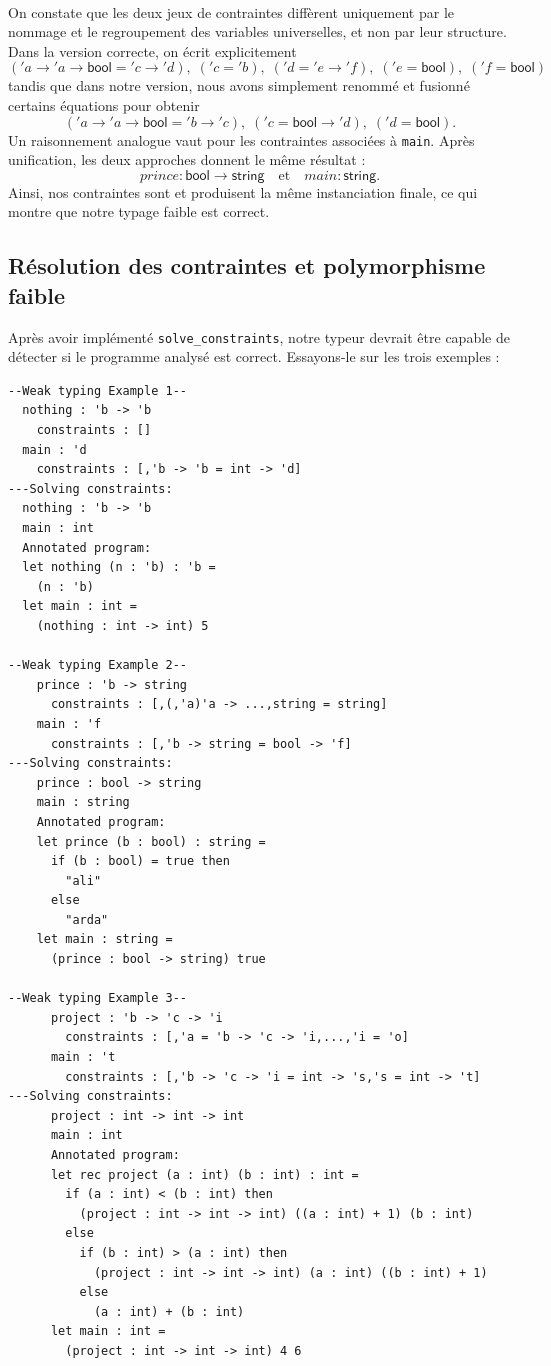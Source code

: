 \paragraph{}
On constate que les deux jeux de contraintes diffèrent uniquement par le nommage et le regroupement des variables universelles, et non par leur structure. Dans la version correcte, on écrit explicitement
\[
    ('a \to 'a \to \mathsf{bool} = 'c \to 'd),\;('c = 'b),\;('d = 'e \to 'f),\;('e = \mathsf{bool}),\;('f = \mathsf{bool})
\]
tandis que dans notre version, nous avons simplement renommé et fusionné certains équations pour obtenir
\[
    ('a \to 'a \to \mathsf{bool} = 'b \to 'c),\;('c = \mathsf{bool} \to 'd),\;('d = \mathsf{bool}).
\]
Un raisonnement analogue vaut pour les contraintes associées à \texttt{main}. Après unification, les deux approches donnent le même résultat :
\[
    prince : \mathsf{bool} \to \mathsf{string}
    \quad\text{et}\quad
    main : \mathsf{string}.
\]
Ainsi, nos contraintes sont et produisent la même instanciation finale, ce qui montre que notre typage faible est correct.

\subsection{Résolution des contraintes et polymorphisme faible}

Après avoir implémenté \texttt{solve\_constraints}, notre typeur devrait être capable de détecter si le programme analysé est correct.
Essayons-le sur les trois exemples :

\begin{lstlisting}
--Weak typing Example 1--
  nothing : 'b -> 'b 
    constraints : []
  main : 'd 
    constraints : [,'b -> 'b = int -> 'd]
---Solving constraints:
  nothing : 'b -> 'b
  main : int
  Annotated program:
  let nothing (n : 'b) : 'b =
    (n : 'b)
  let main : int =
    (nothing : int -> int) 5

--Weak typing Example 2--
    prince : 'b -> string 
      constraints : [,(,'a)'a -> ...,string = string]
    main : 'f 
      constraints : [,'b -> string = bool -> 'f]
---Solving constraints:
    prince : bool -> string
    main : string
    Annotated program:
    let prince (b : bool) : string =
      if (b : bool) = true then
        "ali"
      else
        "arda"
    let main : string =
      (prince : bool -> string) true
    
--Weak typing Example 3--
      project : 'b -> 'c -> 'i 
        constraints : [,'a = 'b -> 'c -> 'i,...,'i = 'o]
      main : 't 
        constraints : [,'b -> 'c -> 'i = int -> 's,'s = int -> 't]
---Solving constraints:
      project : int -> int -> int
      main : int
      Annotated program:
      let rec project (a : int) (b : int) : int =
        if (a : int) < (b : int) then
          (project : int -> int -> int) ((a : int) + 1) (b : int)
        else
          if (b : int) > (a : int) then
            (project : int -> int -> int) (a : int) ((b : int) + 1)
          else
            (a : int) + (b : int)
      let main : int =
        (project : int -> int -> int) 4 6
\end{lstlisting}

